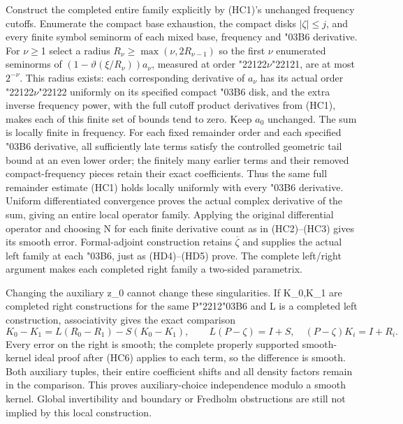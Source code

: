 \documentclass[
  11pt,
]{article}
\begin{document}
Construct the completed entire family explicitly by (HC1)'s unchanged
frequency cutoffs. Enumerate the compact base exhaustion, the compact
disks \(|\zeta|\leq j\), and every finite symbol seminorm of each mixed
base, frequency and {\ReaderSymbols\char"03B6} derivative. For \ensuremath{\nu}\ensuremath{\geq}1 select a radius
\(R_\nu\geq\max(\nu,2R_{\nu-1})\) so the first \ensuremath{\nu} enumerated seminorms of
\((1-\vartheta(\xi/R_\nu))a_\nu\), measured at order {\ReaderSymbols\char"2212}2\ensuremath{\nu}{\ReaderSymbols\char"2212}1, are at most
\(2^{-\nu}\). This radius exists: each corresponding derivative of
\(a_\nu\) has its actual order {\ReaderSymbols\char"2212}2\ensuremath{\nu}{\ReaderSymbols\char"2212}2 uniformly on its specified compact
{\ReaderSymbols\char"03B6} disk, and the extra inverse frequency power, with the full cutoff
product derivatives from (HC1), makes each of this finite set of bounds
tend to zero. Keep \(a_0\) unchanged. The sum is locally finite in
frequency. For each fixed remainder order and each specified {\ReaderSymbols\char"03B6}
derivative, all sufficiently late terms satisfy the controlled geometric
tail bound at an even lower order; the finitely many earlier terms and
their removed compact-frequency pieces retain their exact coefficients.
Thus the same full remainder estimate (HC1) holds locally uniformly with
every {\ReaderSymbols\char"03B6} derivative. Uniform differentiated convergence proves the actual
complex derivative of the sum, giving an entire local operator family.
Applying the original differential operator and choosing N for each
finite derivative count as in (HC2)--(HC3) gives its smooth error.
Formal-adjoint construction retains \(\overline\zeta\) and supplies the
actual left family at each {\ReaderSymbols\char"03B6}, just as (HD4)--(HD5) prove. The complete
left/right argument makes each completed right family a two-sided
parametrix.

Changing the auxiliary z\_0 cannot change these singularities. If
K\_0,K\_1 are completed right constructions for the same P{\ReaderSymbols\char"2212}{\ReaderSymbols\char"03B6} and L is a
completed left construction, associativity gives the exact comparison \[
K_0-K_1=L(R_0-R_1)-S(K_0-K_1),
\qquad L(P-\zeta)=I+S,
\quad (P-\zeta)K_i=I+R_i.
\tag{HD27}
\] Every error on the right is smooth; the complete properly supported
smooth-kernel ideal proof after (HC6) applies to each term, so the
difference is smooth. Both auxiliary tuples, their entire coefficient
shifts and all density factors remain in the comparison. This proves
auxiliary-choice independence modulo a smooth kernel. Global
invertibility and boundary or Fredholm obstructions are still not
implied by this local construction.
\end{document}
